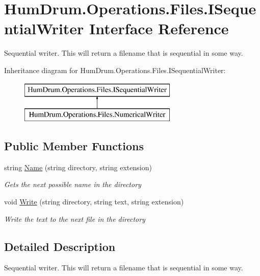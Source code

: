 \hypertarget{interfaceHumDrum_1_1Operations_1_1Files_1_1ISequentialWriter}{}\section{Hum\+Drum.\+Operations.\+Files.\+I\+Sequential\+Writer Interface Reference}
\label{interfaceHumDrum_1_1Operations_1_1Files_1_1ISequentialWriter}


Sequential writer. This will return a filename that is sequential in some way.  


Inheritance diagram for Hum\+Drum.\+Operations.\+Files.\+I\+Sequential\+Writer\+:\begin{figure}[H]
\begin{center}
\leavevmode
\includegraphics[height=2.000000cm]{interfaceHumDrum_1_1Operations_1_1Files_1_1ISequentialWriter}
\end{center}
\end{figure}
\subsection*{Public Member Functions}
\begin{DoxyCompactItemize}
\item 
string \hyperlink{interfaceHumDrum_1_1Operations_1_1Files_1_1ISequentialWriter_aa8afc6673f6dfcc48a30732f2a6d7fa9}{Name} (string directory, string extension)
\begin{DoxyCompactList}\small\item\em Gets the next possible name in the directory \end{DoxyCompactList}\item 
void \hyperlink{interfaceHumDrum_1_1Operations_1_1Files_1_1ISequentialWriter_ab9c1a57dd13d995dd5fdc35103071183}{Write} (string directory, string text, string extension)
\begin{DoxyCompactList}\small\item\em Write the text to the next file in the directory \end{DoxyCompactList}\end{DoxyCompactItemize}


\subsection{Detailed Description}
Sequential writer. This will return a filename that is sequential in some way. 



